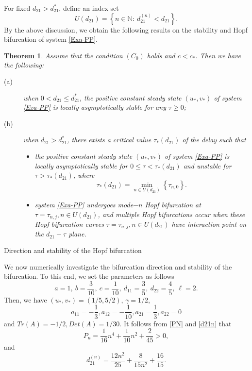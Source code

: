 \documentclass[11pt]{article}
\newtheorem{theorem}{Theorem}[section]
\theoremstyle{definition}
\theoremstyle{remark}
\numberwithin{equation}{section}
\begin{document}
 For fixed $d_{21}>d_{21}^*$, define an index set
  $$U(d_{21})=\left\{n\in \mathbb{N}: ~d_{21}^{(n)}  <d_{21}\right\}. $$
By the above discussion, we obtain the following results on the stability and Hopf bifurcation of system \eqref{Exa-PP}. %
 \begin{theorem}
 \label{The-31}
 Assume that  the condition $(C_0)$ holds and $c<c_*$.    Then we have the following:
    \begin{description}
    \item[(a)] when $0<d_{21}\leq d_{21}^*$,  the positive constant steady state $(u_*, v_*)$  of system \eqref{Exa-PP}  is locally  asymptotically stable   for any $\tau\geq 0$;
\item[(b)] when  $d_{21}>d_{21}^*$, there exists a critical value $\tau_*(d_{21})$ of the delay such that
\begin{itemize}
\item[(b1)] the positive constant steady state $(u_*, v_*)$  of system \eqref{Exa-PP}  is locally  asymptotically stable   for   $0\leq \tau<\tau_*(d_{21})$ and unstable for $ \tau>\tau_*(d_{21})$, where
$$\tau_*(d_{21})=\min\limits_{n\in U(d_{21})}\left\{ \tau_{n, 0}\right\}.$$
\item[(b2)]   system \eqref{Exa-PP}  undergoes mode$-n$ Hopf bifurcation at $\tau=\tau_{n,j}, n\in U(d_{21})$, and multiple Hopf bifurcations occur when these  Hopf bifurcation curves $\tau=\tau_{n,j}, n\in U(d_{21})$  have  interaction point on the $d_{21}-\tau$ plane.
\end{itemize}
\end{description}
  \end{theorem}

\begin{subsection}
{Direction and stability of the Hopf bifurcation}
\end{subsection}

We now numerically investigate the bifurcation direction and stability of the bifurcation. To this end, we set the parameters as follows
$$a=1, ~b=\frac{3}{10}, ~c=\frac{1}{10}, ~d_{11}=\frac{3}{5}, ~d_{22}=\frac{4}{5},~\ell=2.$$
Then, we have $(u_*, v_*)=(1/5, 5/2)$, $\gamma=1/2$,
$$
a_{11} =-\frac{1}{3}, a_{12} =-\frac{1}{10}, a_{21} =\frac{1}{3},  a_{22}=0
$$
and $Tr(A)=-1/2, Det(A)=1/30$.
  It follows from \eqref{PN}  and \eqref{d21n}  that
$$P_n=\frac{1}{16}n ^4 +\frac{1}{10}n^2+\frac{2}{45}>0,  $$
and
\begin{equation}
\label{NSd21N}
d_{21}^{(n)}=\frac{12n^2}{25} +\frac{8}{15n^2} + \frac{16}{15}.
\end{equation}
\end{document}
